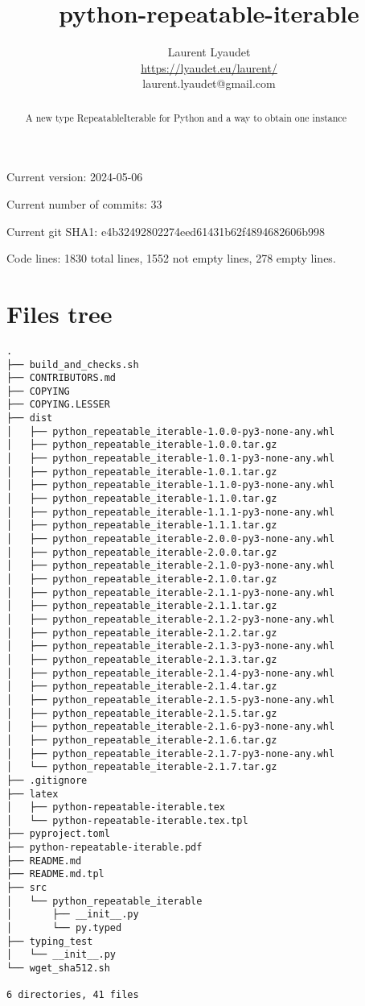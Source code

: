 \documentclass{article}
\begin{document}
\author{
  Laurent Lyaudet\\
  \url{https://lyaudet.eu/laurent/}\\
  laurent.lyaudet@gmail.com
}
\title{python-repeatable-iterable}

\maketitle
\begin{abstract}
A new type RepeatableIterable for Python
and a way to obtain one instance
\end{abstract}

Current version: 2024-05-06

Current number of commits: 33

Current git SHA1: e4b32492802274eed61431b62f4894682606b998

Code lines: 1830 total lines, 1552 not empty lines, 278 empty lines.

\section{Files tree}
\label{section:tree}

\begin{verbatim}
.
├── build_and_checks.sh
├── CONTRIBUTORS.md
├── COPYING
├── COPYING.LESSER
├── dist
│   ├── python_repeatable_iterable-1.0.0-py3-none-any.whl
│   ├── python_repeatable_iterable-1.0.0.tar.gz
│   ├── python_repeatable_iterable-1.0.1-py3-none-any.whl
│   ├── python_repeatable_iterable-1.0.1.tar.gz
│   ├── python_repeatable_iterable-1.1.0-py3-none-any.whl
│   ├── python_repeatable_iterable-1.1.0.tar.gz
│   ├── python_repeatable_iterable-1.1.1-py3-none-any.whl
│   ├── python_repeatable_iterable-1.1.1.tar.gz
│   ├── python_repeatable_iterable-2.0.0-py3-none-any.whl
│   ├── python_repeatable_iterable-2.0.0.tar.gz
│   ├── python_repeatable_iterable-2.1.0-py3-none-any.whl
│   ├── python_repeatable_iterable-2.1.0.tar.gz
│   ├── python_repeatable_iterable-2.1.1-py3-none-any.whl
│   ├── python_repeatable_iterable-2.1.1.tar.gz
│   ├── python_repeatable_iterable-2.1.2-py3-none-any.whl
│   ├── python_repeatable_iterable-2.1.2.tar.gz
│   ├── python_repeatable_iterable-2.1.3-py3-none-any.whl
│   ├── python_repeatable_iterable-2.1.3.tar.gz
│   ├── python_repeatable_iterable-2.1.4-py3-none-any.whl
│   ├── python_repeatable_iterable-2.1.4.tar.gz
│   ├── python_repeatable_iterable-2.1.5-py3-none-any.whl
│   ├── python_repeatable_iterable-2.1.5.tar.gz
│   ├── python_repeatable_iterable-2.1.6-py3-none-any.whl
│   ├── python_repeatable_iterable-2.1.6.tar.gz
│   ├── python_repeatable_iterable-2.1.7-py3-none-any.whl
│   └── python_repeatable_iterable-2.1.7.tar.gz
├── .gitignore
├── latex
│   ├── python-repeatable-iterable.tex
│   └── python-repeatable-iterable.tex.tpl
├── pyproject.toml
├── python-repeatable-iterable.pdf
├── README.md
├── README.md.tpl
├── src
│   └── python_repeatable_iterable
│       ├── __init__.py
│       └── py.typed
├── typing_test
│   └── __init__.py
└── wget_sha512.sh

6 directories, 41 files
\end{verbatim}
\end{document}
